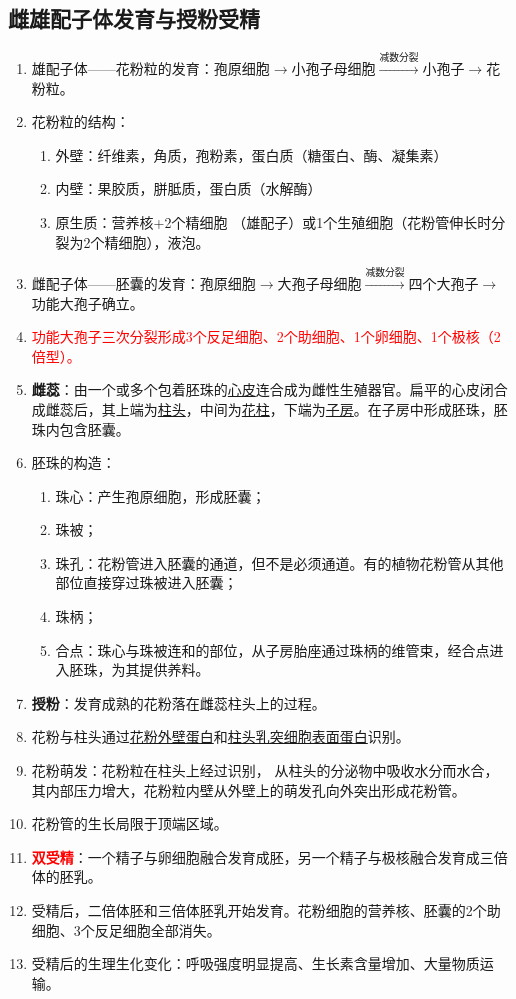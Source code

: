 \subsection{雌雄配子体发育与授粉受精}
\begin{enumerate}
    \item 雄配子体——花粉粒的发育：孢原细胞$\to$小孢子母细胞$\overset{\text{减数分裂}}\longrightarrow$小孢子$\to$花粉粒。
    \item 花粉粒的结构：
    \begin{enumerate}
        \item 外壁：纤维素，角质，孢粉素，蛋白质（糖蛋白、酶、凝集素）
        \item 内壁：果胶质，胼胝质，蛋白质（水解酶）
        \item 原生质：营养核+2个精细胞 （雄配子）或1个生殖细胞（花粉管伸长时分裂为2个精细胞），液泡。
    \end{enumerate}
    \item 雌配子体——胚囊的发育：孢原细胞$\to$大孢子母细胞$\overset{\text{减数分裂}}\longrightarrow$四个大孢子$\to$功能大孢子确立。
    \item \textcolor{red}{功能大孢子三次分裂形成3个反足细胞、2个助细胞、1个卵细胞、1个极核（2倍型）。}
    \item \textbf{雌蕊}：由一个或多个包着胚珠的\uline{心皮}连合成为雌性生殖器官。扁平的心皮闭合成雌蕊后，其上端为\uline{柱头}，中间为\uline{花柱}，下端为\uline{子房}。在子房中形成胚珠，胚珠内包含胚囊。
    \item 胚珠的构造：
    \begin{enumerate}
        \item 珠心：产生孢原细胞，形成胚囊；
        \item 珠被；
        \item 珠孔：花粉管进入胚囊的通道，但不是必须通道。有的植物花粉管从其他部位直接穿过珠被进入胚囊；
        \item 珠柄；
        \item 合点：珠心与珠被连和的部位，从子房胎座通过珠柄的维管束，经合点进入胚珠，为其提供养料。
    \end{enumerate}
    \item \textbf{授粉}：发育成熟的花粉落在雌蕊柱头上的过程。
    \item 花粉与柱头通过\uline{花粉外壁蛋白}和\uline{柱头乳突细胞表面蛋白}识别。
    \item 花粉萌发：花粉粒在柱头上经过识别， 从柱头的分泌物中吸收水分而水合，其内部压力增大，花粉粒内壁从外壁上的萌发孔向外突出形成花粉管。
    \item 花粉管的生长局限于顶端区域。
    \item \textcolor{red}{\textbf{双受精}}：一个精子与卵细胞融合发育成胚，另一个精子与极核融合发育成三倍体的胚乳。
    \item 受精后，二倍体胚和三倍体胚乳开始发育。花粉细胞的营养核、胚囊的2个助细胞、3个反足细胞全部消失。
    \item 受精后的生理生化变化：呼吸强度明显提高、生长素含量增加、大量物质运输。
\end{enumerate}

